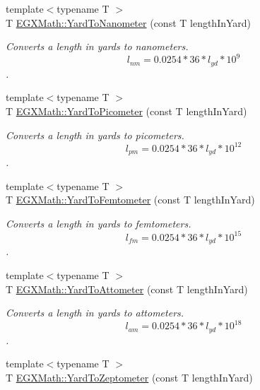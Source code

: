\begin{DoxyCompactItemize}
{\footnotesize template$<$typename T $>$ }\\T \mbox{\hyperlink{group___e_g_x_math-_conversions-_length_conversions-_imperial-_yard-_s_i_ga0cf6f8b8eb4601031f00134232ca3cc1}{E\+G\+X\+Math\+::\+Yard\+To\+Nanometer}} (const T length\+In\+Yard)
\begin{DoxyCompactList}\small\item\em Converts a length in yards to nanometers. \[ l_{nm}=0.0254 * 36 * l_{yd} * 10^{9} \]. \end{DoxyCompactList}\item 
{\footnotesize template$<$typename T $>$ }\\T \mbox{\hyperlink{group___e_g_x_math-_conversions-_length_conversions-_imperial-_yard-_s_i_ga1d0bc498fe3ed1693555aa6917abb758}{E\+G\+X\+Math\+::\+Yard\+To\+Picometer}} (const T length\+In\+Yard)
\begin{DoxyCompactList}\small\item\em Converts a length in yards to picometers. \[ l_{pm}=0.0254 * 36 * l_{yd} * 10^{12} \]. \end{DoxyCompactList}\item 
{\footnotesize template$<$typename T $>$ }\\T \mbox{\hyperlink{group___e_g_x_math-_conversions-_length_conversions-_imperial-_yard-_s_i_ga682215c180b4fc28ca37e6785b59788d}{E\+G\+X\+Math\+::\+Yard\+To\+Femtometer}} (const T length\+In\+Yard)
\begin{DoxyCompactList}\small\item\em Converts a length in yards to femtometers. \[ l_{fm}=0.0254 * 36 * l_{yd} * 10^{15} \]. \end{DoxyCompactList}\item 
{\footnotesize template$<$typename T $>$ }\\T \mbox{\hyperlink{group___e_g_x_math-_conversions-_length_conversions-_imperial-_yard-_s_i_ga312090ed214669c04e4dd8a80c42ccf4}{E\+G\+X\+Math\+::\+Yard\+To\+Attometer}} (const T length\+In\+Yard)
\begin{DoxyCompactList}\small\item\em Converts a length in yards to attometers. \[ l_{am}=0.0254 * 36 * l_{yd} * 10^{18} \]. \end{DoxyCompactList}\item 
{\footnotesize template$<$typename T $>$ }\\T \mbox{\hyperlink{group___e_g_x_math-_conversions-_length_conversions-_imperial-_yard-_s_i_ga4232d885aeba5690a169c72927d57d4e}{E\+G\+X\+Math\+::\+Yard\+To\+Zeptometer}} (const T length\+In\+Yard)

\end{DoxyCompactItemize}
